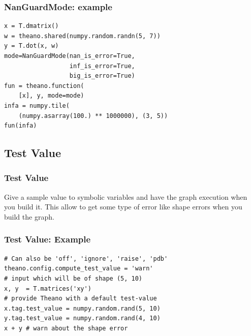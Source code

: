 \documentclass[utf8x,xcolor=pdftex,dvipsnames,table]{beamer}
\begin{document}
\begin{frame}[fragile]
  \frametitle{NanGuardMode: example}
\begin{lstlisting}
x = T.dmatrix()
w = theano.shared(numpy.random.randn(5, 7))
y = T.dot(x, w)
mode=NanGuardMode(nan_is_error=True,
                  inf_is_error=True,
                  big_is_error=True)
fun = theano.function(
    [x], y, mode=mode)
infa = numpy.tile(
    (numpy.asarray(100.) ** 1000000), (3, 5))
fun(infa)
\end{lstlisting}
\end{frame}

\subsection{Test Value}
\begin{frame}[fragile]
  \frametitle{Test Value}

Give a sample value to symbolic variables and have the graph execution
when you build it. This allow to get some type of error like shape
errors when you build the graph.
 \vspace{1cm}
\end{frame}

\begin{frame}[fragile]
  \frametitle{Test Value: Example}
\begin{lstlisting}
# Can also be 'off', 'ignore', 'raise', 'pdb'
theano.config.compute_test_value = 'warn'
# input which will be of shape (5, 10)
x, y  = T.matrices('xy')
# provide Theano with a default test-value
x.tag.test_value = numpy.random.rand(5, 10)
y.tag.test_value = numpy.random.rand(4, 10)
x + y # warn about the shape error
\end{lstlisting}

\end{frame}
\end{document}
